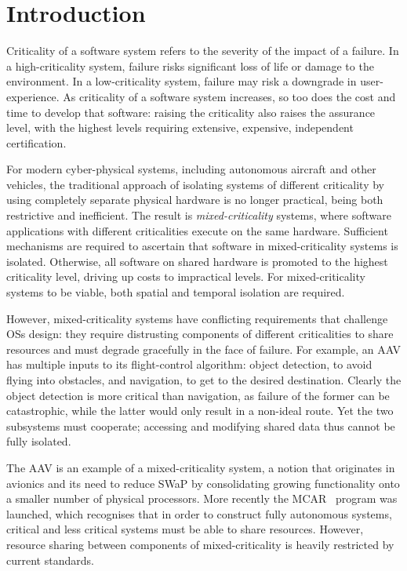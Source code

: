 \chapter{Introduction}

Criticality of a software system refers to the severity of the impact of a failure.
In a high-criticality system, failure risks significant loss of life or damage to the environment.
In a low-criticality system, failure may risk a downgrade in user-experience.
As criticality of a software system increases, so too does the cost and time to develop that
software: raising the criticality also raises the assurance level, with the highest levels requiring
extensive, expensive, independent certification.

For modern cyber-physical systems, including autonomous aircraft and other vehicles, the traditional
approach of isolating systems of different criticality by using completely separate physical
hardware is no
longer practical, being both restrictive and inefficient.
The result is \emph{mixed-criticality} systems, where software applications with different criticalities
execute on the same hardware. Sufficient mechanisms are required to ascertain that software in
mixed-criticality systems is isolated. Otherwise, all software on shared hardware is
promoted
to the highest criticality level, driving up costs to impractical levels. For mixed-criticality
systems to be
viable, both spatial and temporal isolation are required.

However, mixed-criticality systems have conflicting requirements that challenge \glspl{OS} design:
they require distrusting components of different criticalities to share resources and must
degrade gracefully in the face of failure.  For example, an \gls{AAV} has multiple inputs to its
flight-control algorithm: object detection, to avoid flying into obstacles, and navigation, to get
to the desired destination.  Clearly the object detection is more critical than navigation, as
failure of the former can be catastrophic, while the latter would only result in a non-ideal route.
Yet the two subsystems must cooperate; accessing and modifying shared data thus cannot be fully
isolated.

The \gls{AAV} is an example of a mixed-criticality system, a notion that originates in avionics and its
need to reduce \gls{SWaP} by consolidating growing functionality onto a smaller
number of physical processors. More recently the
\gls{MCAR}~\citep{Barhorst_BBHPSSSSU_09} program was launched, which recognises that in order to
construct fully autonomous systems, critical and less critical systems must be able to share
resources. However, resource sharing between components of mixed-criticality is heavily restricted by current
standards.

